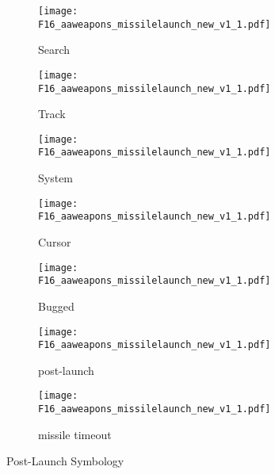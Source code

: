 \begin{figure}[htbp]
    \centering
    \begin{subfigure}[b]{0.15\linewidth}
        \centering
        \texttt{[image: F16\_aaweapons\_missilelaunch\_new\_v1\_1.pdf]}
        \caption{Search}
    \end{subfigure}
    \begin{subfigure}[b]{0.15\linewidth}
        \centering
        \texttt{[image: F16\_aaweapons\_missilelaunch\_new\_v1\_1.pdf]}
        \caption{Track}
    \end{subfigure}
    \begin{subfigure}[b]{0.15\linewidth}
        \centering
        \texttt{[image: F16\_aaweapons\_missilelaunch\_new\_v1\_1.pdf]}
        \caption{System}
    \end{subfigure}
    \begin{subfigure}[b]{0.15\linewidth}
        \centering
        \texttt{[image: F16\_aaweapons\_missilelaunch\_new\_v1\_1.pdf]}
        \caption{Cursor}
    \end{subfigure}
    \begin{subfigure}[b]{0.15\linewidth}
        \centering
        \texttt{[image: F16\_aaweapons\_missilelaunch\_new\_v1\_1.pdf]}
        \caption{Bugged}
    \end{subfigure}
    \begin{subfigure}[b]{0.3\linewidth}
        \centering
        \texttt{[image: F16\_aaweapons\_missilelaunch\_new\_v1\_1.pdf]}
        \caption{post-launch}
    \end{subfigure}
    \begin{subfigure}[b]{0.3\linewidth}
        \centering
        \texttt{[image: F16\_aaweapons\_missilelaunch\_new\_v1\_1.pdf]}
        \caption{missile timeout}
    \end{subfigure}
    \caption{Post-Launch Symbology}
\end{figure}


